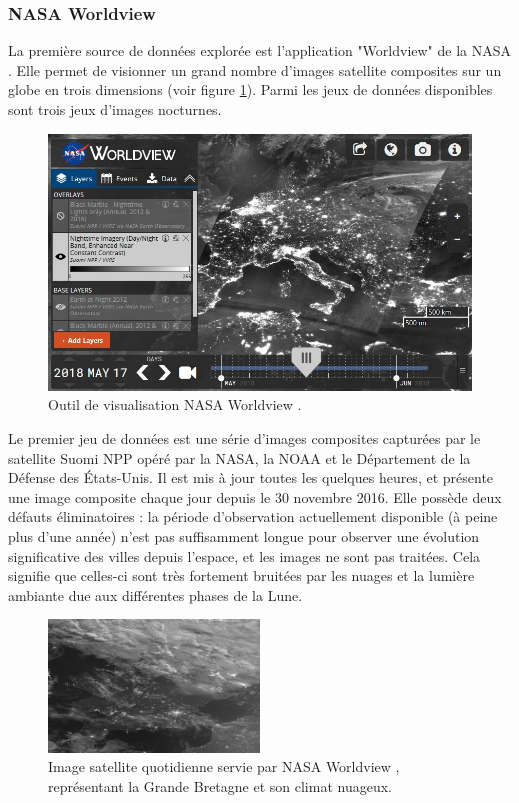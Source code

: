 \documentclass[a4paper, 11pt]{report}
\begin{document}
\subsubsection{NASA Worldview}
La première source de données explorée est l'application "Worldview" de la NASA \cite{nasa-worldview}. Elle permet de visionner un grand nombre d'images satellite composites sur un globe en trois dimensions (voir figure \ref{nasa-worldview-screenshot}). Parmi les jeux de données disponibles sont trois jeux d'images nocturnes.

\begin{figure}[h]
	\centering
	\includegraphics[width=1.0\textwidth]{img/worldview.JPG}
	\caption{Outil de visualisation NASA Worldview \cite{nasa-worldview}.}
	\label{nasa-worldview-screenshot}
\end{figure}

Le premier jeu de données est une série d'images composites capturées par le satellite Suomi NPP opéré par la NASA, la NOAA et le Département de la Défense des États-Unis. Il est mis à jour toutes les quelques heures, et présente une image composite chaque jour depuis le 30 novembre 2016. Elle possède deux défauts éliminatoires : la période d'observation actuellement disponible (à peine plus d'une année) n'est pas suffisamment longue pour observer une évolution significative des villes depuis l'espace, et les images ne sont pas traitées. Cela signifie que celles-ci sont très fortement bruitées par les nuages et la lumière ambiante due aux différentes phases de la Lune.

\begin{figure}[h]
	\centering
	\includegraphics[width=0.5\textwidth]{img/worldview_clouds.JPG}
	\caption{Image satellite quotidienne servie par NASA Worldview \cite{nasa-worldview}, représentant la Grande Bretagne et son climat nuageux.}
	\label{nasa-worldview-daily}
\end{figure}
\end{document}
